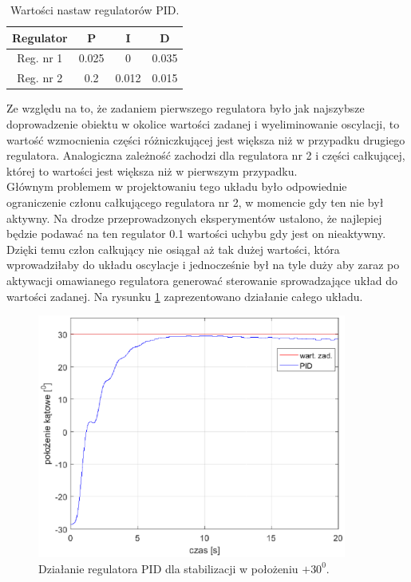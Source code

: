 \documentclass[11pt,a4paper]{article}
\begin{document}
\begin{table}[h]
	\caption{Wartości nastaw regulatorów PID.}
	\label{nastawy_pid}
	\centering
	
	\begin{tabular}{|c|c|c|c|}
		\hline
		Regulator &P&I&D\\
		\hline
		Reg. nr 1 &0.025&   0 &  0.035\\
		\hline
		Reg. nr 2 &0.2 &0.012 &0.015\\ 
		\hline
	\end{tabular}
\end{table}

Ze względu na to, że zadaniem pierwszego regulatora było jak najszybsze doprowadzenie obiektu w okolice wartości zadanej i wyeliminowanie oscylacji, to wartość wzmocnienia części różniczkującej jest większa niż w przypadku drugiego regulatora. Analogiczna zależność zachodzi dla regulatora nr 2 i części całkującej, której to wartości jest większa niż w pierwszym przypadku. \\
Głównym problemem w projektowaniu tego układu było odpowiednie ograniczenie członu całkującego regulatora nr 2, w momencie gdy ten nie był aktywny. Na drodze przeprowadzonych eksperymentów  ustalono, że najlepiej będzie podawać na ten regulator 0.1 wartości uchybu gdy jest on nieaktywny. Dzięki temu człon całkujący nie osiągał aż tak dużej wartości, która wprowadziłaby do układu oscylacje i jednocześnie był na tyle duży aby zaraz po aktywacji omawianego regulatora generować sterowanie sprowadzające układ do wartości zadanej.  Na rysunku \ref{fig:PID_30} zaprezentowano działanie całego układu.

\begin{figure}[H]
	\centering
	\includegraphics[width=4in]{Figures/pid30.eps}
	\caption{Działanie regulatora PID dla stabilizacji w położeniu $+30 ^0$.}
	\label{fig:PID_30}
\end{figure}
\end{document}
